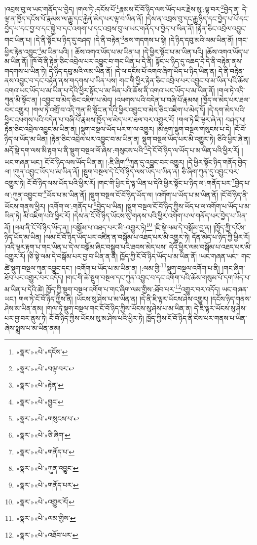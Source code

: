 །འབྲས་བུ་ལ་ཡང་གནོད་པ་བྱེད། །གལ་ཏེ་:དངོས་པོ་\footnote{«སྣར་»«པེ་»དངོས་}རྣམས་ངོ་བོ་ཉིད་ལས་ཡོད་པར་རྗེས་སུ་:ལྟ་བར་\footnote{«སྣར་»«པེ་»བལྟ་བར་}བྱེད་ན། དེ་ལྟ་ན་ཁྱོད་དངོས་པོ་རྣམས་ལ་རྒྱུ་དང་རྐྱེན་མེད་པར་ལྟ་བ་ཡིན་ནོ། །དེས་ན་འབྲས་བུ་དང་རྒྱུ་ཉིད་དང་བྱེད་པ་པོ་དང་བྱེད་པ་དང་བྱ་བ་དང་སྐྱེ་བ་དང་འགག་པ་དང་འབྲས་བུ་ལ་ཡང་གནོད་པ་བྱེད་པ་ཡིན་ནོ། །རྟེན་ཅིང་འབྲེལ་འབྱུང་གང་ཡིན་པ། །དེ་ནི་སྟོང་པ་ཉིད་དུ་བཤད། །དེ་ནི་བརྟེན་\footnote{«སྣར་»«པེ་»རྟེན་}ནས་གདགས་པ་སྟེ། །དེ་ཉིད་དབུ་མའི་ལམ་ཡིན་ནོ། །གང་ཕྱིར་རྟེན་འབྱུང་\footnote{«སྣར་»«པེ་»བྱུང་}མ་ཡིན་པའི། །
ཆོས་འགའ་ཡོད་པ་མ་ཡིན་པ། །དེ་ཕྱིར་སྟོང་པ་མ་ཡིན་པའི། །ཆོས་འགའ་ཡོད་པ་མ་ཡིན་ནོ། །ཁོ་བོ་ནི་རྟེན་ཅིང་འབྲེལ་པར་འབྱུང་བ་གང་ཡིན་པ་དེ་ནི། སྟོང་པ་ཉིད་དུ་འཆད་དེ་དེ་ནི་བརྟེན་ནས་གདགས་པ་ཡིན་ཏེ། དེ་ཉིད་དབུ་མའི་ལམ་ཡིན་ནོ། །དེ་ལ་དངོས་པོ་འགའ་ཞིག་ཡོད་པ་ཉིད་ཡིན་ན། དེ་ནི་བརྟེན་ནས་འབྱུང་བ་དང་བརྟེན་ནས་གདགས་པ་ཡིན་པས། གང་གི་ཕྱིར་རྟེན་ཅིང་འབྲེལ་པར་འབྱུང་བ་མ་ཡིན་པའི་ཆོས་འགའ་ཡང་ཡོད་པ་མ་ཡིན་པ་དེའི་ཕྱིར་སྟོང་པ་མ་ཡིན་པའི་ཆོས་ནི་འགའ་ཡང་ཡོད་པ་མ་ཡིན་ནོ། །གལ་ཏེ་འདི་ཀུན་མི་སྟོང་ན། །འབྱུང་བ་མེད་ཅིང་འཇིག་པ་མེད། །འཕགས་པའི་བདེན་པ་བཞི་པོ་རྣམས། །ཁྱོད་ལ་མེད་པར་ཐལ་བར་འགྱུར། །གལ་ཏེ་འགྲོ་བ་འདི་ཀུན་མི་སྟོང་ན་དེའི་ཕྱིར་འབྱུང་བ་མེད་ཅིང་འཇིག་པ་མེད་དོ། །དེ་དག་མེད་པའི་ཕྱིར་འཕགས་པའི་བདེན་པ་བཞི་པོ་རྣམས་ཁྱོད་ལ་མེད་པར་ཐལ་བར་འགྱུར་རོ། །གལ་ཏེ་ཇི་ལྟར་ཞེ་ན། བཤད་པ། རྟེན་ཅིང་འབྲེལ་འབྱུང་མ་ཡིན་ན། །སྡུག་བསྔལ་ཡོད་པར་ག་ལ་འགྱུར། །མི་རྟག་སྡུག་བསྔལ་གསུངས་པ་དེ། །ངོ་བོ་ཉིད་ལ་ཡོད་མ་ཡིན། །རྟེན་ཅིང་འབྲེལ་པར་འབྱུང་བ་མ་ཡིན་ན། སྡུག་བསྔལ་ཡོད་པར་མི་འགྱུར་ཏེ། ཅིའི་ཕྱིར་ཞེ་ན། མདོ་སྡེ་དག་ལས་མི་རྟག་པ་ནི་སྡུག་བསྔལ་ལོ་ཞེས་:གསུངས་པའི་\footnote{«སྣར་»«པེ་»གསུངས་པ་}དེ་ངོ་བོ་ཉིད་ལ་ཡོད་པ་མ་ཡིན་པའི་ཕྱིར་རོ། །ཡང་གཞན་ཡང་། ངོ་བོ་ཉིད་ལས་ཡོད་ཡིན་ན། །:ཇི་ཞིག་\footnote{«སྣར་»«པེ་»ཅི་ཞིག་}ཀུན་དུ་འབྱུང་བར་འགྱུར། །དེ་ཕྱིར་སྟོང་ཉིད་གནོད་བྱེད་ལ། །ཀུན་འབྱུང་ཡོད་པ་མ་ཡིན་ནོ། །སྡུག་བསྔལ་དེ་ངོ་བོ་ཉིད་ལས་ཡོད་པ་ཡིན་ན། ཅི་ཞིག་ཀུན་དུ་འབྱུང་བར་འགྱུར་ཏེ། ངོ་བོ་ཉིད་ལས་ཡོད་པའི་ཕྱིར་རོ། །གང་གི་ཕྱིར་དེ་ལྟ་ཡིན་པ་དེའི་ཕྱིར་སྟོང་པ་ཉིད་ལ་:གནོད་པར་\footnote{«སྣར་»«པེ་»གནོད་པ་}བྱེད་པ་ལ་:ཀུན་འབྱུང་བ་\footnote{«སྣར་»«པེ་»ཀུན་འབྱུང་}ཡོད་པ་མ་ཡིན་ནོ། །སྡུག་བསྔལ་ངོ་བོ་ཉིད་ཡོད་ལ། །འགོག་པ་ཡོད་པ་མ་ཡིན་ནོ། །ངོ་བོ་ཉིད་ནི་ཡོངས་གནས་ཕྱིར། །འགོག་ལ་:གནོད་པ་\footnote{«སྣར་»«པེ་»གནོད་པར་}བྱེད་པ་ཡིན། །སྡུག་བསྔལ་ངོ་བོ་ཉིད་ཀྱིས་ཡོད་པ་ལ་འགོག་པ་ཡོད་པ་མ་ཡིན་ཏེ། མི་འཇིག་པའི་ཕྱིར་རོ། །དེས་ན་ངོ་བོ་ཉིད་ཡོངས་སུ་གནས་པའི་ཕྱིར་འགོག་པ་ལ་གནོད་པར་བྱེད་པ་ཡིན་ནོ། །ལམ་ནི་ངོ་བོ་ཉིད་ཡོད་ན། །བསྒོམ་པ་འཐད་པར་མི་:འགྱུར་ཏེ།\footnote{«སྣར་»«པེ་»འགྱུར་རོ།} །ཇི་སྟེ་ལམ་དེ་བསྒོམ་བྱ་ན། །ཁྱོད་ཀྱི་དངོས་ཉིད་ཡོད་མ་ཡིན། །ལམ་ངོ་བོ་ཉིད་ཡོད་པར་འཛིན་ན་བསྒོམ་པ་འཐད་པར་མི་འགྱུར་ཏེ། དོན་མེད་པ་ཉིད་ཀྱི་ཕྱིར་རོ། །འདི་ལྟར་རྟག་པ་གང་ཡིན་པ་དེ་ལ་བསྒོམ་ཞིང་བསྒྲུབ་པའི་ཐབས་མེད་པས། དེའི་ཕྱིར་ལམ་བསྒོམ་པ་འཐད་པར་མི་འགྱུར་རོ། །ཅི་སྟེ་ལམ་དེ་བསྒོམ་པར་བྱ་བ་ཡིན་ན་ནི། ཁྱོད་ཀྱི་ངོ་བོ་ཉིད་ཡོད་པ་མ་ཡིན་ནོ། །ཡང་གཞན་ཡང་། གང་ཚེ་སྡུག་བསྔལ་ཀུན་འབྱུང་དང་། །འགོག་པ་ཡོད་པ་མ་ཡིན་ན། །:ལམ་གྱི་\footnote{«སྣར་»«པེ་»ལམ་གྱིས་}སྡུག་བསྔལ་འགོག་པ་ནི། །གང་ཞིག་ཐོབ་པར་འགྱུར་བར་འདོད། །གང་གི་ཚེ་སྡུག་བསྔལ་དང་ཀུན་འབྱུང་བ་དང་འགོག་པའི་ཆོས་གསུམ་པོ་དག་ཡོད་པ་མ་ཡིན་པ་དེའི་ཚེ། ཁྱོད་ཀྱི་སྡུག་བསྔལ་འགོག་པ་གང་ཞིག་ལམ་གྱིས་:ཐོབ་པར་\footnote{«སྣར་»«པེ་»འཐོབ་པར་}འགྱུར་བར་འདོད། ཡང་གཞན་ཡང་། གལ་ཏེ་ངོ་བོ་ཉིད་ཀྱིས་ནི། །ཡོངས་སུ་ཤེས་པ་མ་ཡིན་ན། །དེ་ནི་ཇི་ལྟར་ཡོངས་ཤེས་འགྱུར། །དངོས་ཉིད་གནས་ཤེས་མ་ཡིན་ནམ། །གལ་ཏེ་སྡུག་བསྔལ་གང་ངོ་བོ་ཉིད་ཀྱིས་ཡོངས་སུ་ཤེས་པ་མ་ཡིན་ན། དེ་ཇི་ལྟར་ཡོངས་སུ་ཤེས་པར་བྱ་བར་ནུས་ཏེ། ངོ་བོ་ཉིད་ཀྱིས་ཡོངས་སུ་མ་ཤེས་པའི་ཕྱིར་ཏེ། ཁྱོད་ཀྱིས་ངོ་བོ་ཉིད་ནི་ངེས་པར་གནས་པ་ཡིན་ཞེས་སྨྲས་པ་མ་ཡིན་ནམ། 
